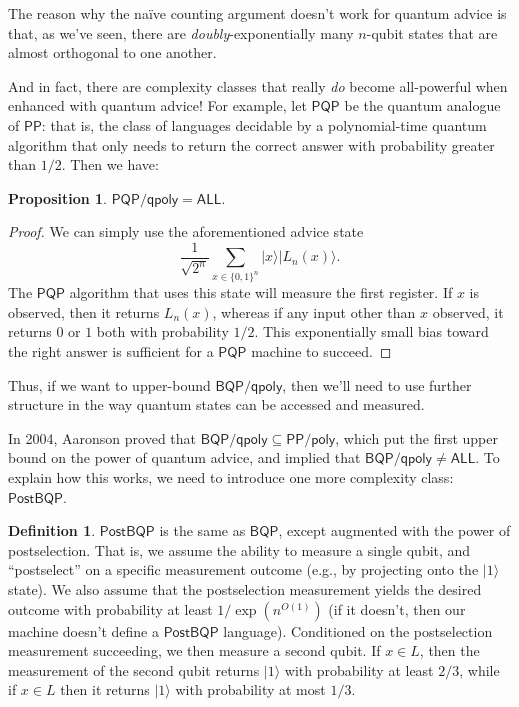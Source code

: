 \documentclass[12pt]{report}
\theoremstyle{plain}
\newtheorem{proposition}[theorem]{Proposition}
\theoremstyle{definition}
\newtheorem{definition}[theorem]{Definition}
\renewcommand{\ket}[1]{|#1\rangle}
\begin{document}
The reason why the na\"{i}ve counting argument doesn't work for quantum advice is that, as we've seen, there are {\em doubly}-exponentially many $n$-qubit states that are almost orthogonal to one another.

And in fact, there are complexity classes that really {\em do} become all-powerful when enhanced with quantum advice!  For example, let $\mathsf{PQP}$ be the quantum analogue of $\mathsf{PP}$: that is, the class of languages decidable by a polynomial-time quantum algorithm that only needs to return the correct answer with probability greater than $1/2$.  Then we have:

\begin{proposition}
  $\mathsf{PQP/qpoly} = \mathsf{ALL}.$
\end{proposition}
\begin{proof}
We can simply use the aforementioned advice state
$$ \frac{1}{\sqrt{2^n}} \sum_{x \in \{ 0, 1 \}^n}\ket{ x} \ket{ L_n( x) }. $$
The $\mathsf{PQP}$ algorithm that uses this state will measure the first register.  If $x$ is observed, then it returns $L_n( x)$, whereas if any input other than $x$ observed, it returns $0$ or $1$ both with probability $1/2$.
This exponentially small bias toward the right answer is sufficient for a $\mathsf{PQP}$ machine to succeed.
\end{proof}

Thus, if we want to upper-bound $\mathsf{BQP/qpoly}$, then we'll need to use further structure in the way quantum states can be accessed and measured.

In 2004, Aaronson \cite{aar:adv} proved that $\mathsf{BQP/qpoly} \subseteq \mathsf{PP/poly}$, which put the first upper bound on the power of quantum advice, and implied that $\mathsf{BQP/qpoly} \neq \mathsf{ALL}$.  To explain how this works, we need to introduce one more complexity class: $\mathsf{PostBQP}$.

\begin{definition} $\mathsf{PostBQP}$
is the same as $\mathsf{BQP}$, except augmented with the power of postselection.
That is, we assume the ability to measure a single qubit, and ``postselect'' on a specific measurement outcome (e.g., by projecting onto
the $\ket{1}$ state).  We also assume that the postselection measurement yields the desired outcome with probability at least $1/\exp(n^{O(1)})$ (if it doesn't, then our machine doesn't define a $\mathsf{PostBQP}$ language).  Conditioned on the postselection measurement succeeding, we then measure a second qubit.  If $x\in L$, then the measurement of the second qubit returns $\ket{1}$ with probability at least $2/3$, while if $x\in L$
then it returns $\ket{1}$ with probability at most $1/3$.
\end{definition}
\end{document}
